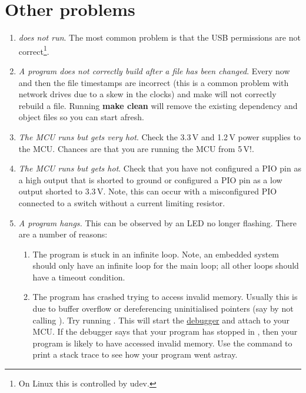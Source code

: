 \section{Other problems}
\label{faq}

\begin{enumerate}
\item
  \emph{ does not run}. The most common problem is
  that the USB permissions are not correct\footnote{On Linux this is
    controlled by udev.}.

\item
  \emph{A program does not correctly build after a file has been
    changed}. Every now and then the file timestamps are incorrect
  (this is a common problem with network drives due to a skew in the
  clocks) and make will not correctly rebuild a file. Running
  \textbf{make clean} will remove the existing dependency and object
  files so you can start afresh.

\item \emph{The MCU runs but gets very hot}.  Check the 3.3\,V and
  1.2\,V power supplies to the MCU.  Chances are that you are running
  the MCU from 5\,V!.

\item \emph{The MCU runs but gets hot}.  Check that you have not
  configured a PIO pin as a high output that is shorted to ground or
  configured a PIO pin as a low output shorted to 3.3\,V.  Note, this
  can occur with a misconfigured PIO connected to a switch without a
  current limiting resistor.

\item
  \emph{A program hangs.} This can be observed by an LED no longer
  flashing. There are a number of reasons:

  \begin{enumerate}
  \item
    The program is stuck in an infinite loop. Note, an embedded system
    should only have an infinite loop for the main loop; all other loops
    should have a timeout condition.
  \item
    The program has crashed trying to access invalid memory. Usually
    this is due to buffer overflow or dereferencing uninitialised
    pointers (say by not calling ). Try running
    .  This will start the
    \protect\hyperref[debugging]{debugger} and attach to your MCU. If
    the debugger says that your program has stopped in
    , then your program is likely to have
    accessed invalid memory. Use the  command to print a
    stack trace to see how your program went astray.


\end{enumerate}
\end{enumerate}
